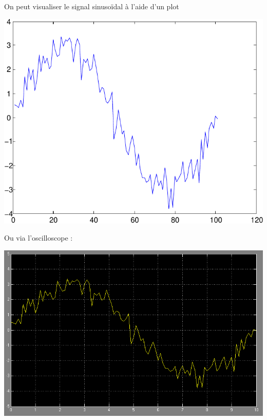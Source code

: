 \documentclass[10pt]{article}
\begin{document}
  \subsection{}
   On peut visualiser le signal sinusoïdal à l’aide d’un plot %
   \begin{center}
    \includegraphics{1d}
   \end{center}
   Ou via l’oscilloscope :
   \begin{center}
    \includegraphics[width=16cm]{1d_scope}
   \end{center}
\end{document}
